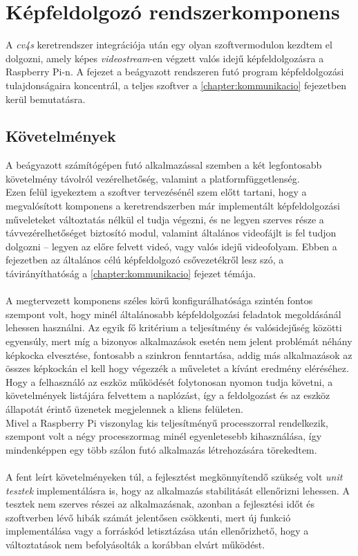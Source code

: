 \chapter{Képfeldolgozó rendszerkomponens} \label{chapter:kepfeldolgozo}

A \emph{cv4s} keretrendszer integrációja után egy olyan szoftvermodulon kezdtem el dolgozni, amely képes \textit{videostream}-en végzett valós idejű képfeldolgozásra a Raspberry Pi-n. A fejezet a beágyazott rendszeren futó program képfeldolgozási tulajdonságaira koncentrál, a teljes szoftver a \ref{chapter:kommunikacio} fejezetben kerül bemutatásra.

\section{Követelmények}

A beágyazott számítógépen futó alkalmazással szemben a két legfontosabb követelmény távolról vezérelhetőség, valamint a platformfüggetlenség. \\
Ezen felül igyekeztem a szoftver tervezésénél szem előtt tartani, hogy a megvalósított komponens a keretrendszerben már implementált képfeldolgozási műveleteket változtatás nélkül el tudja végezni, és ne legyen szerves része a távvezérelhetőséget biztosító modul, valamint általános videofájlt is fel tudjon dolgozni -- legyen az előre felvett videó, vagy valós idejű videofolyam. Ebben a fejezetben az általános célú képfeldolgozó csővezetékről lesz szó, a távirányíthatóság a \ref{chapter:kommunikacio} fejezet témája. \\
\\
A megtervezett komponens széles körű konfigurálhatósága szintén fontos szempont volt, hogy minél általánosabb képfeldolgozási feladatok megoldásánál lehessen használni. Az egyik fő kritérium a teljesítmény és valósidejűség közötti egyensúly, mert míg a  bizonyos alkalmazások esetén nem jelent problémát néhány képkocka elvesztése, fontosabb a szinkron fenntartása, addig más alkalmazások az összes képkockán el kell hogy végezzék a műveletet a kívánt eredmény eléréséhez.\\
Hogy a felhasználó az eszköz működését folytonosan nyomon tudja követni, a követelmények listájára felvettem a naplózást, így a feldolgozást és az eszköz állapotát érintő üzenetek megjelennek a kliens felületen.\\
Mivel a Raspberry Pi viszonylag kis teljesítményű processzorral rendelkezik, szempont volt a négy processzormag minél egyenletesebb kihasználása, így mindenképpen egy több szálon futó alkalmazás létrehozására törekedtem.\\
\\
A fent leírt követelményeken túl, a fejlesztést megkönnyítendő szükség volt \emph{unit tesztek} implementálásra is, hogy az alkalmazás stabilitását ellenőrizni lehessen. A tesztek nem szerves részei az alkalmazásnak, azonban a fejlesztési időt és szoftverben lévő hibák számát jelentősen csökkenti, mert új funkció implementálása vagy a forráskód letisztázása után ellenőrizhető, hogy a változtatások nem befolyásolták a korábban elvárt működést.

